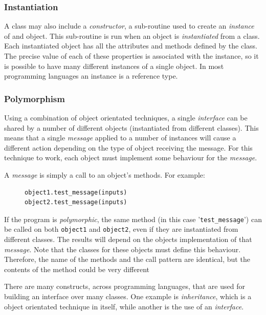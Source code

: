 \documentclass[10pt]{article}
\begin{document}
\subsubsection{Instantiation}
\label{sec:org26fd0aa}

A class may also include a \emph{constructor}, a sub-routine used to create an \emph{instance} of and object. This sub-routine is run when an object is \emph{instantiated} from a class. Each instantiated object has all the attributes and methods defined by the class. The precise value of each of these properties is associated with the instance, so it is possible to have many different instances of a single object. In most programming languages an instance is a reference type.

\subsubsection{Polymorphism}
\label{sec:org643d06b}

Using a combination of object orientated techniques, a single \emph{interface} can be shared by a number of different objects (instantiated from different classes). This means that a single \emph{message} applied to a number of instances will cause a different action depending on the type of object receiving the message. For this technique to work, each object must implement some behaviour for the \emph{message}.

A \emph{message} is simply a call to an object's methods. For example:

\begin{figure}[H]
\begin{verbatim}
object1.test_message(inputs)
object2.test_message(inputs)
\end{verbatim}
\end{figure}

If the program is \emph{polymorphic}, the same method (in this case '\texttt{test\_message}') can be called on both \texttt{object1} and \texttt{object2}, even if they are instantiated from different classes. The results will depend on the objects implementation of that \emph{message}. Note that the classes for these objects must define this behaviour. Therefore, the name of the methods and the call pattern are identical, but the contents of the method could be very different

There are many constructs, across programming languages, that are used for building an interface over many classes. One example is \emph{inheritance}, which is a object orientated technique in itself, while another is the use of an \emph{interface}.
\end{document}
